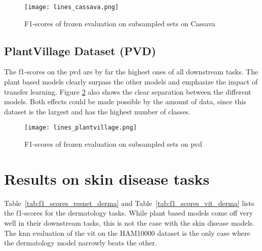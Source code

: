 \begin{figure}[H]
    \begin{center}
    \texttt{[image: lines\_cassava.png]}
    \caption{F1-scores of frozen evaluation on subsampled sets on Cassava}\label{fig:lines_cassava}
    \end{center}
\end{figure}

\subsection{PlantVillage Dataset (PVD)}
The f1-scores on the \gls{pvd} are by far the highest ones of all downstream tasks. 
The plant based models clearly surpass the other models and emphasize the impact of transfer learning.
Figure \ref{fig:lines_plantvillage} also shows the clear separation between the different models.
Both effects could be made possible by the amount of data, since this dataset is the largest and has the highest number of classes. 

\begin{figure}[H]
    \begin{center}
    \texttt{[image: lines\_plantvillage.png]}
    \caption{F1-scores of frozen evaluation on subsampled sets on \gls{pvd}}\label{fig:lines_plantvillage}
    \end{center}
\end{figure}

\section{Results on skin disease tasks}
Table~\ref{tab:f1_scores_resnet_derma} and Table~\ref{tab:f1_scores_vit_derma} lists the f1-scores for the dermatology tasks. 
While plant based models come off very well in their downstream tasks, this is not the case with the skin disease models. 
The \gls{knn} evaluation of the \gls{vit} on the HAM10000 dataset is the only case where the dermatology model narrowly beats the other.


